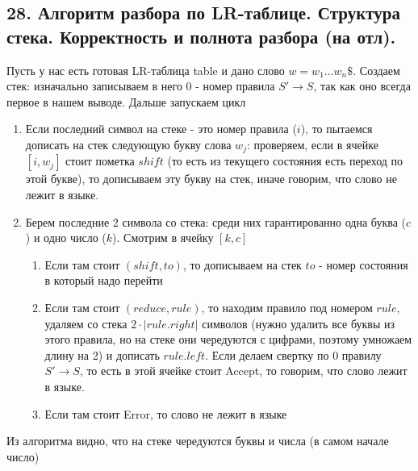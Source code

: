 \subsection{28. Алгоритм разбора по LR-таблице. Структура стека. Корректность и полнота разбора (на отл).}
\par Пусть у нас есть готовая LR-таблица table и дано слово $w=w_1 \ldots w_n\$$. Создаем стек: изначально записываем в него 0 - номер правила $S' \rightarrow S$, так как оно всегда первое в нашем выводе. Дальше запускаем цикл \begin{enumerate}
    \item Если последний символ на стеке - это номер правила ($i$), то пытаемся дописать на стек следующую букву слова $w_j$: проверяем, если в ячейке $[i, w_j]$ стоит пометка $shift$ (то есть из текущего состояния есть переход по этой букве), то дописываем эту букву на стек, иначе говорим, что слово не лежит в языке.
    \item Берем последние 2 символа со стека: среди них гарантированно одна буква ($c$) и одно число ($k$). Смотрим в ячейку $[k, c]$ \begin{enumerate}
        \item Если там стоит $(shift, to)$, то дописываем на стек $to$ - номер состояния в который надо перейти
        \item Если там стоит $(reduce, rule)$, то находим правило под номером $rule$, удаляем со стека $2 \cdot |rule.right|$ символов (нужно удалить все буквы из этого правила, но на стеке они чередуются с цифрами, поэтому умножаем длину на 2)  и дописать $rule.left$. Если делаем свертку по 0 правилу $S' \rightarrow S$, то есть в этой ячейке стоит Accept, то говорим, что слово лежит в языке.
        \item Если там стоит Error, то слово не лежит в языке
    \end{enumerate}
\end{enumerate}
\par Из алгоритма видно, что на стеке чередуются буквы и числа (в самом начале число)